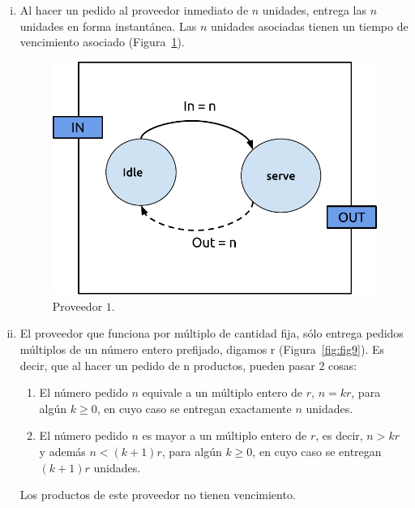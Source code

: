 \documentclass[10pt]{article}
\begin{document}
\begin{enumerate}[i)]
\item Al hacer un pedido al proveedor inmediato de $n$ unidades, entrega las $n$ unidades en forma instantánea. Las $n$ unidades asociadas tienen un tiempo de vencimiento asociado (Figura~\ref{fig:fig8}).

\begin{figure}
\centering
\includegraphics[scale=0.8]{img/figura8}
\caption{Proveedor $1$.}
\label{fig:fig8}
\end{figure}

\item El proveedor que funciona por múltiplo de cantidad fija, sólo entrega pedidos múltiplos de un número entero prefijado, digamos r (Figura~\ref{fig:fig9}). Es decir, que al hacer un pedido de n productos, pueden pasar 2 cosas:

\begin{enumerate}[1)]
\item El número pedido $n$ equivale a un múltiplo entero de $r$, $n = k r$, para algún $k \geq 0$, en cuyo caso se entregan exactamente $n$ unidades.
\item El número pedido $n$ es mayor a un múltiplo entero de $r$, es decir, $n > k r$ y además $n < (k+1)r$, para algún $k \geq 0$, en cuyo caso se entregan $(k+1)r$ unidades.
\end{enumerate}

Los productos de este proveedor no tienen vencimiento.


\end{enumerate}
\end{document}
